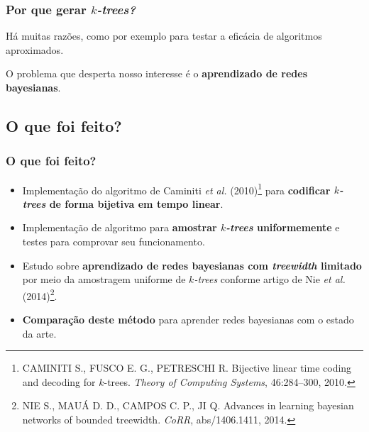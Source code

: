 \documentclass{beamer}
\begin{document}
  \begin{frame}
    \frametitle{Por que gerar \emph{$k$-trees?}}

    Há muitas razões, como por exemplo para testar a eficácia de algoritmos aproximados.

    \vspace{1em}

    O problema que desperta nosso interesse é o \textbf{aprendizado de redes bayesianas}.
  \end{frame}

  \subsection{O que foi feito?}

  \begin{frame}
    \frametitle{O que foi feito?}

    \begin{itemize}
      \item Implementação do algoritmo de Caminiti \emph{et al.} (2010)\footnote{\scriptsize CAMINITI S., FUSCO E. G., PETRESCHI R. Bijective linear time coding and decoding for $k$-trees. \emph{Theory of Computing Systems}, 46:284--300, 2010.} para \textbf{codificar \emph{$k$-trees} de forma bijetiva em tempo linear}.
      \item Implementação de algoritmo para \textbf{amostrar \emph{$k$-trees} uniformemente} e testes para comprovar seu funcionamento.
      \item Estudo sobre \textbf{aprendizado de redes bayesianas com \emph{treewidth} limitado} por meio da amostragem uniforme de \emph{$k$-trees} conforme artigo de Nie \emph{et al.} (2014)\footnote{\scriptsize NIE S., MAUÁ D. D., CAMPOS C. P., JI Q. Advances in learning bayesian networks of bounded treewidth. \emph{CoRR}, abs/1406.1411, 2014.}.
      \item \textbf{Comparação deste método} para aprender redes bayesianas com o estado da arte.
    \end{itemize}
  \end{frame}

%
%
\end{document}
